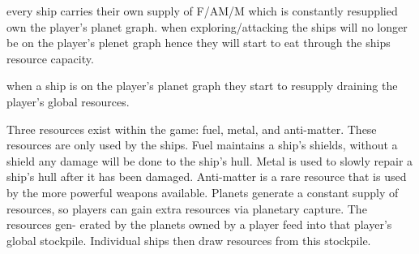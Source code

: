 		every ship carries their own supply of F/AM/M which is constantly resupplied own the player's planet graph.
		when exploring/attacking the ships will no longer be on the player's plenet graph hence they will start to eat through the ships resource capacity.

		when a ship is on the player's planet graph they start to resupply draining the player's global resources.





Three resources exist within the game: fuel, metal, and anti-matter. These resources are only used by the ships. Fuel maintains a ship’s shields, without a shield any damage will be done to the ship’s hull. Metal is used to slowly repair a ship’s hull after it has been damaged. Anti-matter is a rare resource that is used by the more powerful weapons available.
Planets generate a constant supply of resources, so players can gain extra resources via planetary capture. The resources gen- erated by the planets owned by a player feed into that player’s global stockpile. Individual ships then draw resources from this stockpile.